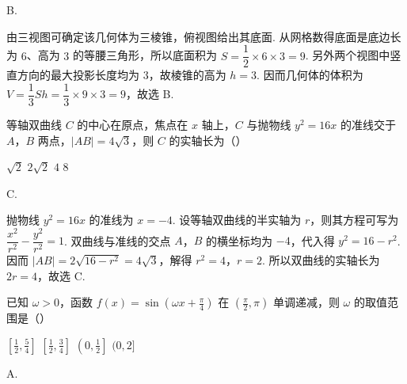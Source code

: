 \begin{answer}
B.
\end{answer}

\begin{solution}
由三视图可确定该几何体为三棱锥，俯视图给出其底面. 从网格数得底面是底边长为 \(6\)、高为 \(3\) 的等腰三角形，所以底面积为 \(S=\dfrac12\times6\times3=9\). 另外两个视图中竖直方向的最大投影长度均为 \(3\)，故棱锥的高为 \(h=3\). 因而几何体的体积为 \(V=\dfrac13Sh=\dfrac13\times9\times3=9\)，故选 B.
\end{solution}

\begin{problem}
等轴双曲线 \(C\) 的中心在原点，焦点在 \(x\) 轴上，\(C\) 与抛物线 \( y^{2} = 16x \) 的准线交于 \(A\)，\(B\) 两点，\( |AB| = 4\sqrt{3} \)，则 \(C\) 的实轴长为（\quad）

\choices
    {\(\sqrt{2}\)}
    {\(2\sqrt{2}\)}
    {\(4\)}
    {\(8\)}
\end{problem}

\begin{answer}
C.
\end{answer}

\begin{solution}
抛物线 \(y^2=16x\) 的准线为 \(x=-4\). 设等轴双曲线的半实轴为 \(r\)，则其方程可写为 \(\dfrac{x^2}{r^2}-\dfrac{y^2}{r^2}=1\). 双曲线与准线的交点 \(A\)，\(B\) 的横坐标均为 \(-4\)，代入得 \(y^2=16-r^2\). 因而 \(|AB|=2\sqrt{16-r^2}=4\sqrt3\)，解得 \(r^2=4\)，\(r=2\). 所以双曲线的实轴长为 \(2r=4\)，故选 C.
\end{solution}

\begin{problem}
已知 \(\omega > 0\)，函数 \(f(x) = \sin \left(\omega x + \frac{\pi}{4}\right)\) 在 \(\left(\frac{\pi}{2}, \pi\right)\) 单调递减，则 \(\omega\) 的取值范围是（\quad）

\choices
    {\(\left[\frac{1}{2}, \frac{5}{4}\right]\)}
    {\(\left[\frac{1}{2}, \frac{3}{4}\right]\)}
    {\(\left(0, \frac{1}{2}\right]\)}
    {\((0, 2]\)}
\end{problem}

\begin{answer}
A.
\end{answer}

